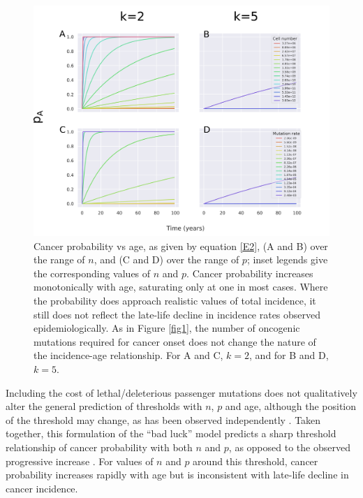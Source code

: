 \documentclass[12pt,onecolumn,twoside]{article}
\begin{document}
\begin{figure}[!ht]
	\begin{minipage}[c]{0.6\textwidth}
		\includegraphics[width=\linewidth, keepaspectratio=true]{fig2.png}
	\end{minipage}
	\begin{minipage}[c]{0.4\textwidth}
		\caption{Cancer probability vs age, as given by equation \ref{E2}, (A and B) over the range of $n$, and (C and D) over the range of $p$; inset legends give the corresponding values of $n$ and $p$. Cancer probability increases monotonically with age, saturating only at one in most cases. Where the probability does approach realistic values of total incidence, it still does not reflect the late-life decline in incidence rates observed epidemiologically. As in Figure \ref{fig1}, the number of oncogenic mutations required for cancer onset does not change the nature of the incidence-age relationship. For A and C, $k=2$, and for B and D, $k=5$.}
		\label{fig2}
	\end{minipage} 
\end{figure}

Including the cost of lethal/deleterious passenger mutations does not qualitatively alter the general prediction of thresholds with $n$, $p$ and age, although the position of the threshold may change, as has been observed independently \autocite{McFarland2013}. Taken together, this formulation of the ``bad luck'' model predicts a sharp threshold relationship of cancer probability with both $n$ and $p$, as opposed to the observed progressive increase \autocite{Tomasetti78, Tomasetti2017}. For values of $n$ and $p$ around this threshold, cancer probability increases rapidly with age but is inconsistent with late-life decline in cancer incidence.
\end{document}
